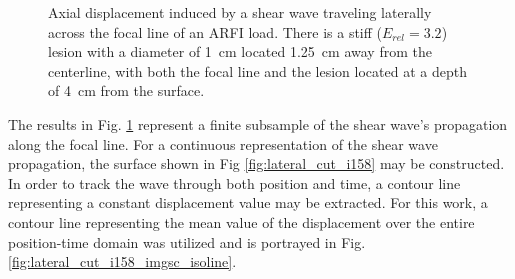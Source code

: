 			\begin{figure}[!htb]
				\centering
				\caption[Sample shear wave motion through time]{Axial displacement induced by a shear wave traveling laterally across the focal line of an ARFI load. There is a stiff ($E_{rel} = 3.2$) lesion with a diameter of \SI{1}{\cm} located \SI{1.25}{\cm} away from the centerline, with both the focal line and the lesion located at a depth of \SI{4}{\cm} from the surface.}
				\label{fig:lateral_wave_i158}
			\end{figure}

			The results in Fig. \ref{fig:lateral_wave_i158} represent a finite subsample of the shear wave's propagation along the focal line. For a continuous representation of the shear wave propagation, the surface shown in Fig \ref{fig:lateral_cut_i158} may be constructed. In order to track the wave through both position and time, a contour line representing a constant displacement value may be extracted. For this work, a contour line representing the mean value of the displacement over the entire position-time domain was utilized and is portrayed in Fig. \ref{fig:lateral_cut_i158_imgsc_isoline}.

